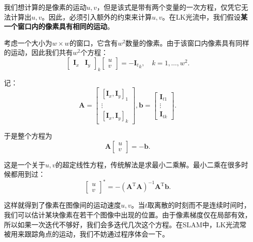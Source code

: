 我们想计算的是像素的运动$u,v$，但是该式是带有两个变量的一次方程，仅凭它无法计算出$u,v$。因此，必须引入额外的约束来计算$u,v$。在LK光流中，我们假设\textbf{某一个窗口内的像素具有相同的运动}。

\clearpage
考虑一个大小为$w \times w$的窗口，它含有$w^2$数量的像素。由于该窗口内像素具有同样的运动，因此我们共有$w^2$个方程：
\begin{equation}
\left[ {\begin{array}{*{20}{c}}
	{{ \bm{I}_x}}&{{ \bm{I}_y}}
	\end{array}} \right]_k
\left[ \begin{array}{l}
u\\
v
\end{array} \right] =  - {\bm{I}_t}_k, \quad k=1, \ldots, w^2.
\end{equation}

记：
\begin{equation}
\bm{A} = \left[ {\begin{array}{*{20}{c}}
	{{{\left[ {{\bm{I}_x},{\bm{I}_y}} \right]}_1}}\\
	\vdots \\
	{{{\left[ {{\bm{I}_x},{\bm{I}_y}} \right]}_k}}
	\end{array}} \right],\bm{b} = \left[ {\begin{array}{*{20}{c}}
	{{ \bm{I}_{t1}}}\\
	\vdots \\
	{{ \bm{I}_{tk}}}
	\end{array}} \right].
\end{equation}

于是整个方程为
\begin{equation}
\bm{A}\left[ \begin{array}{l}
u\\
v
\end{array} \right] =  - \bm{b}.
\end{equation}

这是一个关于$u,v$的超定线性方程，传统解法是求最小二乘解。最小二乘在很多时候都用到过：
\begin{equation}
{\left[ \begin{array}{l}
	u\\
	v
	\end{array} \right]^*} = -{\left( {{ \bm{A}^\mathrm{T}}\bm{A}} \right)^{ - 1}}{ \bm{A}^\mathrm{T}}\bm{b}.
\end{equation}

这样就得到了像素在图像间的运动速度$u,v$。当$t$取离散的时刻而不是连续时间时，我们可以估计某块像素在若干个图像中出现的位置。由于像素梯度仅在局部有效，所以如果一次迭代不够好，我们会多迭代几次这个方程。在SLAM中，LK光流常被用来跟踪角点的运动，我们不妨通过程序体会一下。

